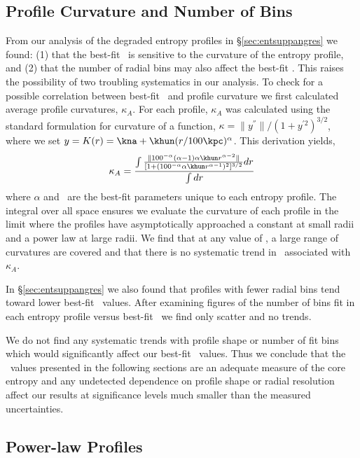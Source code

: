 \subsection{Profile Curvature and Number of Bins}
\label{sec:entsuppcurve}

From our analysis of the degraded entropy profiles in
\S\ref{sec:entsuppangres} we found: (1) that the best-fit \kna\ is sensitive
to the curvature of the entropy profile, and (2) that the number of
radial bins may also affect the best-fit \kna. This raises the
possibility of two troubling systematics in our analysis. To check for
a possible correlation between best-fit \kna\ and profile curvature we
first calculated average profile curvatures, $\kappa_A$. For each
profile, $\kappa_A$ was calculated using the standard formulation for
curvature of a function, $\kappa = \|y^{''}\|/(1+y^{'2})^{3/2}$, where
we set $y = K(r) = \kna+\khun(r/100\kpc)^{\alpha}$. This derivation
yields,
\begin{equation}
\kappa_A = \frac{\int\frac{\| 100^{-\alpha} (\alpha-1) \alpha \khun
  r^{\alpha-2}\|}{[1+(100^{-\alpha} \alpha \khun
    r^{\alpha-1})^2]^{3/2}} dr}{\int dr}
\end{equation}
where $\alpha$ and \khun\ are the best-fit parameters unique to each
entropy profile. The integral over all space ensures we evaluate the
curvature of each profile in the limit where the profiles have
asymptotically approached a constant at small radii and a power law at
large radii. We find that at any value of \kna, a large range of
curvatures are covered and that there is no systematic trend in \kna\
associated with $\kappa_A$.

In \S\ref{sec:entsuppangres} we also found that profiles with fewer radial
bins tend toward lower best-fit \kna\ values. After examining figures
of the number of bins fit in each entropy profile versus best-fit
\kna\ we find only scatter and no trends. 

We do not find any systematic trends with profile shape or number of
fit bins which would significantly affect our best-fit \kna\
values. Thus we conclude that the \kna\ values presented in the
following sections are an adequate measure of the core entropy and any
undetected dependence on profile shape or radial resolution affect our
results at significance levels much smaller than the measured
uncertainties.

\subsection{Power-law Profiles}
\label{sec:entsuppquality}

